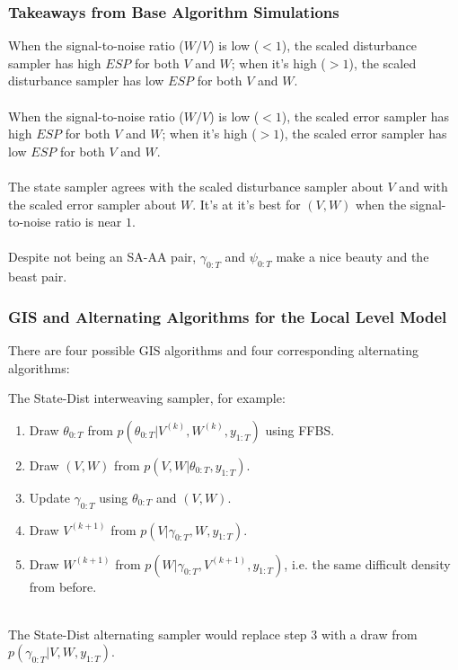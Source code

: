 \documentclass[xcolor=dvipsnames]{beamer}\usepackage{graphicx, color}
\begin{document}
\begin{frame}
  \frametitle{Takeaways from Base Algorithm Simulations}
  When the signal-to-noise ratio ($W/V$) is low ($<1$), the scaled disturbance sampler has high $ESP$ for both $V$ and $W$; when it's high ($>1$), the scaled disturbance sampler has low $ESP$ for both $V$ and $W$.\\~\\
  
  When the signal-to-noise ratio ($W/V$) is low ($<1$), the scaled error sampler has high $ESP$ for both $V$ and $W$; when it's high ($>1$), the scaled error sampler has low $ESP$ for both $V$ and $W$.\\~\\
  
  The state sampler agrees with the scaled disturbance sampler about $V$ and with the scaled error sampler about $W$. It's at it's best for $(V,W)$ when the signal-to-noise ratio is near $1$.\\~\\
  
  Despite not being an SA-AA pair, $\gamma_{0:T}$ and $\psi_{0:T}$ make a nice beauty and the beast pair.
  
\end{frame}


\begin{frame}
  \frametitle{GIS and Alternating Algorithms for the Local Level Model}
There are four possible GIS algorithms and four corresponding alternating algorithms:
\begin{table}[h]
  \centering
  \label{table:sams}
\end{table}
\pause

The State-Dist interweaving sampler, for example:
\begin{enumerate}
  \item Draw $\theta_{0:T}$ from $p(\theta_{0:T}|V^{(k)},W^{(k)},y_{1:T})$ using FFBS.
  \item Draw $(V,W)$ from $p(V,W|\theta_{0:T}, y_{1:T})$.
  \item Update $\gamma_{0:T}$ using $\theta_{0:T}$ and $(V,W)$.
  \item Draw $V^{(k+1)}$ from $p(V|\gamma_{0:T}, W, y_{1:T})$.
  \item Draw $W^{(k+1)}$ from $p(W|\gamma_{0:T}, V^{(k+1)}, y_{1:T})$, i.e. the same difficult density from before.\\~\\
\end{enumerate}
\pause
  The State-Dist alternating sampler would replace step 3 with a draw from $p(\gamma_{0:T}|V,W,y_{1:T})$.
\end{frame}
\end{document}
